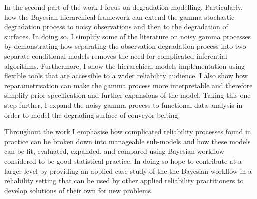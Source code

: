 In the second part of the work I focus on degradation modelling.
Particularly, how the Bayesian hierarchical framework can extend the gamma stochastic degradation process to noisy observations and then to the degradation of surfaces.
In doing so, I simplify some of the literature on noisy gamma processes by demonstrating how separating the observation-degradation process into two separate conditional models removes the need for complicated inferential algorithms. 
Furthermore, I show the hierarchical models implementation using flexible tools that are accessible to a wider reliability audience.
I also show how reparametrisation can make the gamma process more interpretable and therefore simplify prior specification and further expansions of the model.
Taking this one step further, I expand the noisy gamma process to functional data analysis in order to model the degrading surface of conveyor belting.

Throughout the work I emphasise how complicated reliability processes found in practice can be broken down into manageable sub-models and how these models can be fit, evaluated, expanded, and compared using Bayesian workflow considered to be good statistical practice.
In doing so hope to contribute at a larger level by providing an applied case study of the the Bayesian workflow in a reliability setting that can be used by other applied reliability practitioners to develop solutions of their own for new problems.

\vspace*{\fill}